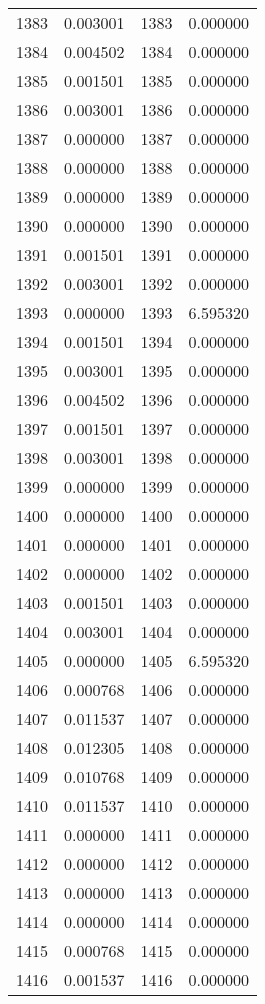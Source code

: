 \documentclass[12pt]{article}
\begin{document}
\begin{longtable}{@{}cccc@{}}
1383 & 0.003001 & 1383 & 0.000000 \\
1384 & 0.004502 & 1384 & 0.000000 \\
1385 & 0.001501 & 1385 & 0.000000 \\
1386 & 0.003001 & 1386 & 0.000000 \\
1387 & 0.000000 & 1387 & 0.000000 \\
1388 & 0.000000 & 1388 & 0.000000 \\
1389 & 0.000000 & 1389 & 0.000000 \\
1390 & 0.000000 & 1390 & 0.000000 \\
1391 & 0.001501 & 1391 & 0.000000 \\
1392 & 0.003001 & 1392 & 0.000000 \\
1393 & 0.000000 & 1393 & 6.595320 \\
1394 & 0.001501 & 1394 & 0.000000 \\
1395 & 0.003001 & 1395 & 0.000000 \\
1396 & 0.004502 & 1396 & 0.000000 \\
1397 & 0.001501 & 1397 & 0.000000 \\
1398 & 0.003001 & 1398 & 0.000000 \\
1399 & 0.000000 & 1399 & 0.000000 \\
1400 & 0.000000 & 1400 & 0.000000 \\
1401 & 0.000000 & 1401 & 0.000000 \\
1402 & 0.000000 & 1402 & 0.000000 \\
1403 & 0.001501 & 1403 & 0.000000 \\
1404 & 0.003001 & 1404 & 0.000000 \\
1405 & 0.000000 & 1405 & 6.595320 \\
1406 & 0.000768 & 1406 & 0.000000 \\
1407 & 0.011537 & 1407 & 0.000000 \\
1408 & 0.012305 & 1408 & 0.000000 \\
1409 & 0.010768 & 1409 & 0.000000 \\
1410 & 0.011537 & 1410 & 0.000000 \\
1411 & 0.000000 & 1411 & 0.000000 \\
1412 & 0.000000 & 1412 & 0.000000 \\
1413 & 0.000000 & 1413 & 0.000000 \\
1414 & 0.000000 & 1414 & 0.000000 \\
1415 & 0.000768 & 1415 & 0.000000 \\
1416 & 0.001537 & 1416 & 0.000000 \\

\end{longtable}
\end{document}
